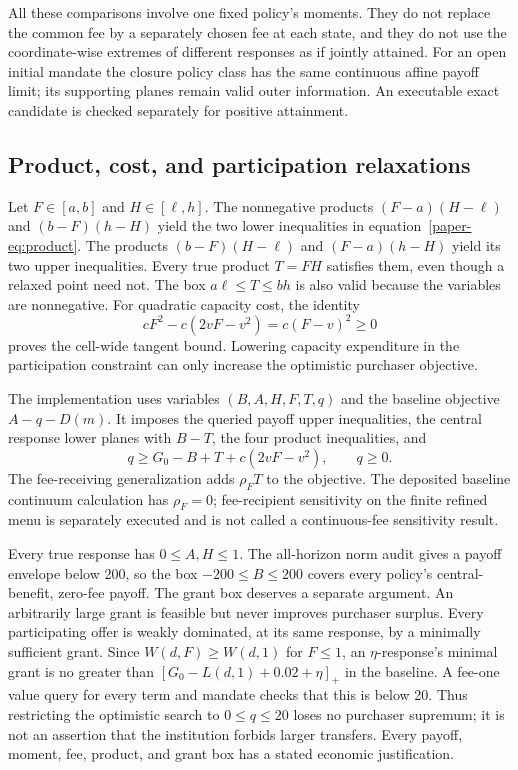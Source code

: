 All these comparisons involve one fixed policy's moments. They do not replace the common fee by a separately chosen fee at each state, and they do not use the coordinate-wise extremes of different responses as if jointly attained. For an open initial mandate the closure policy class has the same continuous affine payoff limit; its supporting planes remain valid outer information. An executable exact candidate is checked separately for positive attainment.

\subsection{Product, cost, and participation relaxations}
Let $F\in[a,b]$ and $H\in[\ell,h]$. The nonnegative products
$(F-a)(H-\ell)$ and $(b-F)(h-H)$ yield the two lower inequalities in equation~\eqref{paper-eq:product}. The products $(b-F)(H-\ell)$ and $(F-a)(h-H)$ yield its two upper inequalities. Every true product $T=FH$ satisfies them, even though a relaxed point need not. The box $a\ell\leq T\leq bh$ is also valid because the variables are nonnegative. For quadratic capacity cost, the identity
\[
 cF^2-c(2vF-v^2)=c(F-v)^2\geq0
\]
proves the cell-wide tangent bound. Lowering capacity expenditure in the participation constraint can only increase the optimistic purchaser objective.

The implementation uses variables $(B,A,H,F,T,q)$ and the baseline objective $A-q-D(m)$. It imposes the queried payoff upper inequalities, the central response lower planes with $B-T$, the four product inequalities, and
\[
 q\geq G_0-B+T+c(2vF-v^2),\qquad q\geq0.
\]
The fee-receiving generalization adds $\rho_F T$ to the objective. The deposited baseline continuum calculation has $\rho_F=0$; fee-recipient sensitivity on the finite refined menu is separately executed and is not called a continuous-fee sensitivity result.

Every true response has $0\leq A,H\leq1$. The all-horizon norm audit gives a payoff envelope below 200, so the box $-200\leq B\leq200$ covers every policy's central-benefit, zero-fee payoff. The grant box deserves a separate argument. An arbitrarily large grant is feasible but never improves purchaser surplus. Every participating offer is weakly dominated, at its same response, by a minimally sufficient grant. Since $W(d,F)\geq W(d,1)$ for $F\leq1$, an $\eta$-response's minimal grant is no greater than
$[G_0-L(d,1)+0.02+\eta]_+$ in the baseline. A fee-one value query for every term and mandate checks that this is below 20. Thus restricting the optimistic search to $0\leq q\leq20$ loses no purchaser supremum; it is not an assertion that the institution forbids larger transfers. Every payoff, moment, fee, product, and grant box has a stated economic justification.

